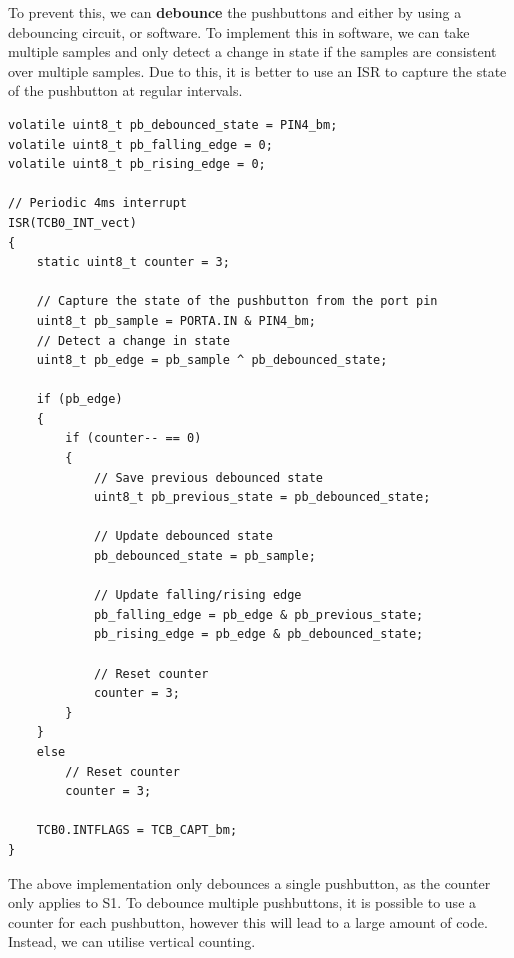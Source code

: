 \documentclass[a4paper]{report}
\begin{document}
To prevent this, we can \textbf{debounce} the pushbuttons and either by using a debouncing circuit, or software.
To implement this in software, we can take multiple samples and only detect a change in state if the samples are consistent
over multiple samples. Due to this, it is better to use an ISR to capture the state of the pushbutton at regular intervals.
\begin{verbatim}
volatile uint8_t pb_debounced_state = PIN4_bm;
volatile uint8_t pb_falling_edge = 0;
volatile uint8_t pb_rising_edge = 0;

// Periodic 4ms interrupt
ISR(TCB0_INT_vect)
{
    static uint8_t counter = 3;

    // Capture the state of the pushbutton from the port pin
    uint8_t pb_sample = PORTA.IN & PIN4_bm;
    // Detect a change in state
    uint8_t pb_edge = pb_sample ^ pb_debounced_state;

    if (pb_edge)
    {
        if (counter-- == 0)
        {
            // Save previous debounced state
            uint8_t pb_previous_state = pb_debounced_state;

            // Update debounced state
            pb_debounced_state = pb_sample;

            // Update falling/rising edge
            pb_falling_edge = pb_edge & pb_previous_state;
            pb_rising_edge = pb_edge & pb_debounced_state;

            // Reset counter
            counter = 3;
        }
    }
    else
        // Reset counter
        counter = 3;

    TCB0.INTFLAGS = TCB_CAPT_bm;
}
\end{verbatim}
The above implementation only debounces a single pushbutton, as the counter
only applies to S1. To debounce multiple pushbuttons, it is possible to
use a counter for each pushbutton, however this will lead to a large
amount of code. Instead, we can utilise vertical counting.
\end{document}
